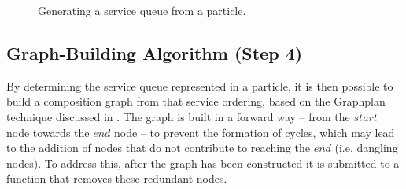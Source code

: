 \documentclass{llncs}
\begin{document}
\begin{figure}[h]
\centerline{
}
 \caption{Generating a service queue from a particle.}
 \label{queue}
\end{figure}

\subsection{Graph-Building Algorithm (Step 4)}

By determining the service queue represented in a particle, it is then possible to build a composition graph from that service ordering, based on the Graphplan technique discussed in \cite{blum1997fast}. The graph is built in a forward way -- from the $start$ node towards the $end$ node -- to prevent the formation of cycles, which may lead to the addition of nodes that do not contribute to reaching the $end$ (i.e. dangling nodes). To address this, after the graph has been constructed it is submitted to a function that removes these redundant nodes.
\end{document}
